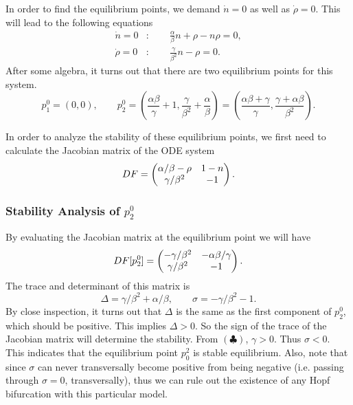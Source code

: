 In order to find the equilibrium points, we demand $\dot{n} = 0$ as well as $\dot{\rho} = 0$. This will lead to the following equations
\begin{align*}
	\dot{n} = 0&: \qquad \frac{\alpha}{\beta} n + \rho - n\rho = 0, \\
	\dot{\rho} =0&: \qquad \frac{\gamma}{\beta^2}n - \rho = 0.
\end{align*}
After some algebra, it turns out that there are two equilibrium points for this system.
\[ p^0_1 = (0,0), \qquad p^0_2 = (\frac{\alpha\beta}{\gamma} + 1, \frac{\gamma}{\beta^2}+\frac{\alpha}{\beta}) = (\frac{\alpha\beta+\gamma}{\gamma},\frac{\gamma + \alpha\beta}{\beta^2}). \tag{E.1.1} \]
%	

In order to analyze the stability of these equilibrium points, we first need to calculate the Jacobian matrix of the ODE system 
\[ DF = \begin{pmatrix} \alpha/\beta-\rho & 1-n \\ \gamma/\beta^2 & -1 \end{pmatrix}. \]

\subsubsection{Stability Analysis of $p^0_2$}
By evaluating the Jacobian matrix at the equilibrium point we will have
\[ DF[p^0_2] = \begin{pmatrix} -\gamma/\beta^2 & -\alpha\beta/\gamma \\ \gamma/\beta^2 & -1 \end{pmatrix}. \]
The trace and determinant of this matrix is
\[  \Delta = \gamma/\beta^2 + \alpha/\beta, \qquad \sigma=-\gamma/\beta^2 - 1.  \]
By close inspection, it turns out that $\Delta$ is the same as the first component of $p^0_2$, which should be positive. This implies $\Delta > 0$. So the sign of the trace of the Jacobian matrix will determine the stability. From $(\clubsuit)$, $\gamma>0$. Thus $\sigma < 0$. This indicates that the equilibrium point $p_0^2$ is stable equilibrium. Also, note that since $\sigma$ can never transversally become positive from being negative (i.e. passing through $\sigma=0$, transversally), thus we can rule out the existence of any Hopf bifurcation with this particular model.


